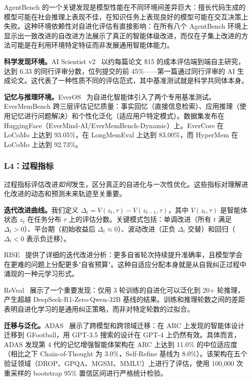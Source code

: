 AgentBench 的一个关键发现是模型性能在不同环境间差异巨大：擅长代码生成的模型可能在社会推理上表现不佳，在知识任务上表现良好的模型可能在交互决策上失败。这种环境依赖性对自进化评估有直接影响：在所有八个 AgentBench 环境上显示出一致改进的自改进方法展示了真正的智能体级改进，而仅在子集上改进的方法可能是在利用环境特定特征而非发展通用智能体能力。

\textbf{科学发现环境。}AI Scientist v2~\citep{aiscientist2024} 以约每篇论文 \$15 的成本评估端到端自主研究，达到 6.33 的同行评审分数，位列提交的前 45\%——第一篇通过同行评审的 AI 生成论文。这代表了一种性质不同的评估范式，其中基准测试就是科学共同体本身。

\textbf{记忆与推理环境。}EverOS~\citep{everos2025} 为自进化智能体引入了两个专用基准测试。EverMemBench 跨三层评估记忆质量：事实回忆（直接信息检索）、应用推理（使用记忆进行问题解决）和个性化泛化（适应用户特定模式）。数据集发布在 HuggingFace（EverMind-AI/EverMemBench-Dynamic）上。EverCore 在 LoCoMo 上达到 93.05\%，在 LongMemEval 上达到 83.00\%，而 HyperMem 在 LoCoMo 上达到 92.73\%。


\subsubsection{L4：过程指标}
\label{sec:eval-L4}

过程指标评估改进\emph{如何}发生，区分真正的自进化与一次性优化。这些指标对理解进化改进的动态和预测未来轨迹至关重要。

\textbf{迭代改进曲线。}我们定义 $\Delta_t = V(z_t, \tau) - V(z_{t-1}, \tau)$，其中 $V(z_t, \tau)$ 是智能体状态 $z_t$ 在任务分布 $\tau$ 上的评估分数。关键模式包括：单调改进（所有 $t$ 满足 $\Delta_t > 0$）、平台期（初始收益后 $\Delta_t \approx 0$）、波动改进（正负 $\Delta_t$ 交替）和回归（$\Delta_t < 0$ 表示负迁移）。

RISE~\citep{rise2024} 提供了详细的迭代改进分析：更多自省轮次持续提升准确率，且模型学会在更难的问题上分配更多"自省预算"。这种自适应分配本身就是从自我纠正过程中涌现的一种元学习形式。

ReVeal~\citep{reveal2025} 展示了一个重要发现：仅用 3 轮训练的自进化可以泛化到 20+ 轮推理，产生超越 DeepSeek-R1-Zero-Qwen-32B 基线的结果。训练和推理轮数之间的差距表明自进化学习的是通用纠正策略，而非对特定轮数的过拟合。

\textbf{迁移与泛化。}ADAS~\citep{adas2025} 展示了跨模型和跨领域迁移：在 ARC 上发现的智能体设计迁移到 GFootball，用 GPT-3.5 搜索的设计在 GPT-4 上仍然有效。具体而言，ADAS 发现第 4 代的记忆增强智能体架构在 ARC 上达到 11.0\% 的中位适应度（相比之下 Chain-of-Thought 为 3.0\%，Self-Refine 基线为 8.0\%）。该架构在五个验证领域（DROP、GPQA、MGSM、MMLU）上进行了评估，使用 100,000 次重采样的 bootstrap 95\% 置信区间进行严格统计检验。

